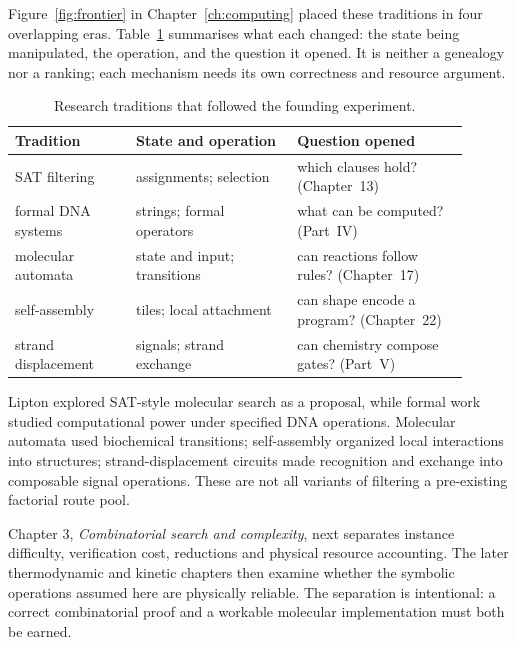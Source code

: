 Figure~\ref{fig:frontier} in Chapter~\ref{ch:computing} placed these traditions in
four overlapping eras. Table~\ref{tab:d2traditions} summarises what each changed:
the state being manipulated, the operation, and the question it opened. It is
neither a genealogy nor a ranking; each mechanism needs its own correctness and
resource argument.

\begin{table}[h]
\centering\small
\caption{Research traditions that followed the founding experiment.}\label{tab:d2traditions}
\begin{tabular}{@{}p{0.24\linewidth}p{0.32\linewidth}p{0.34\linewidth}@{}}
\toprule
Tradition & State and operation & Question opened\\
\midrule
SAT filtering & assignments; selection & which clauses hold? (Chapter~13)\\
formal DNA systems & strings; formal operators & what can be computed? (Part~IV)\\
molecular automata & state and input; transitions & can reactions follow rules? (Chapter~17)\\
self-assembly & tiles; local attachment & can shape encode a program? (Chapter~22)\\
strand displacement & signals; strand exchange & can chemistry compose gates? (Part~V)\\
\bottomrule
\end{tabular}
\end{table}

Lipton explored SAT-style molecular search as a proposal,\cite{Lipton1995} while formal work studied computational power under specified DNA operations.\cite{Boneh1996} Molecular automata used biochemical transitions;\cite{Benenson2001} self-assembly organized local interactions into structures;\cite{Winfree1998} strand-displacement circuits made recognition and exchange into composable signal operations.\cite{Seelig2006} These are not all variants of filtering a pre-existing factorial route pool.

Chapter 3, \emph{Combinatorial search and complexity}, next separates instance difficulty, verification cost, reductions and physical resource accounting. The later thermodynamic and kinetic chapters then examine whether the symbolic operations assumed here are physically reliable. The separation is intentional: a correct combinatorial proof and a workable molecular implementation must both be earned.

